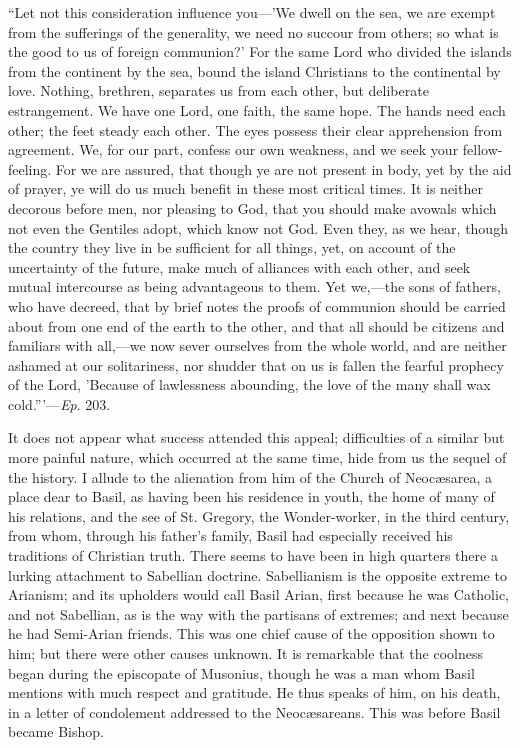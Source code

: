 ``Let not this consideration influence you—'We dwell on the
sea, we are exempt from the sufferings of the generality, we need no
succour from others; so what is the good to us of foreign communion?'
For the same Lord who divided the islands from the continent by the
sea, bound the island Christians to the continental by love. Nothing,
brethren, separates us from each other, but deliberate estrangement.
We have one Lord, one faith, the same hope. The hands need each other;
the feet steady each other. The eyes possess their clear apprehension
from agreement. We, for our part, confess our own weakness, and we
seek your fellow-feeling. For we are assured, that though ye are not
present in body, yet by the aid of prayer, ye will do us much benefit
in these most critical times. It is neither decorous before men, nor
pleasing to God, that you should make avowals which not even the
Gentiles adopt, which know not God. Even they, as we hear, though the
country they live in be sufficient for all things, yet, on account of
the uncertainty of the future, make much of alliances with each other,
and seek mutual intercourse as being advantageous to them. Yet we,—the
sons of fathers, who have decreed, that by brief notes the proofs of
communion should be carried about from one end of the earth to the
other, and that all should be citizens and familiars with all,—we
now sever ourselves from the whole world, and are neither ashamed at
our solitariness, nor shudder that on us is fallen the fearful
prophecy of the Lord, 'Because of lawlessness abounding, the love of
the many shall wax cold.'''—\emph{Ep}. 203.

It does not appear what success attended this appeal; difficulties
of a similar but more painful nature, which occurred at the same time,
hide from us the sequel of the history. I allude to the alienation
from him of the Church of Neocæsarea, a place dear to Basil, as
having been his residence in youth, the home of many of his relations,
and the see of St. Gregory, the Wonder-worker, in the third
century, from whom, through his father's family, Basil had especially
received his traditions of Christian truth. There seems to have been
in high quarters there a lurking attachment to Sabellian doctrine.
Sabellianism is the opposite extreme to Arianism; and its upholders
would call Basil Arian, first because he was Catholic, and not
Sabellian, as is the way with the partisans of extremes; and next
because he had Semi-Arian friends. This was one chief cause of the
opposition shown to him; but there were other causes unknown. It is
remarkable that the coolness began during the episcopate of Musonius,
though he was a man whom Basil mentions with much respect and
gratitude. He thus speaks of him, on his death, in a letter of
condolement addressed to the Neocæsareans. This was before Basil
became Bishop.

